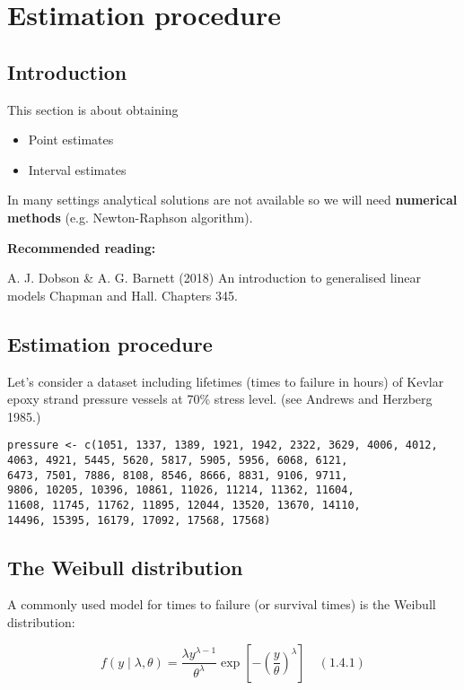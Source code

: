 \documentclass[11pt]{article}
\begin{document}
\section{Estimation procedure}

\subsection{Introduction}

This section is about obtaining
\begin{itemize}
    \item Point estimates
    \item Interval estimates
\end{itemize}

In many settings analytical solutions are not available so we will need \textbf{numerical methods} (e.g. Newton-Raphson algorithm).

\textbf{Recommended reading:}

A. J. Dobson \& A. G. Barnett (2018) An introduction to generalised linear models Chapman and Hall. Chapters 345.

\subsection{Estimation procedure}

Let's consider a dataset including lifetimes (times to failure in hours) of Kevlar epoxy strand pressure vessels at 70\% stress level. (see Andrews and Herzberg 1985.)

\begin{verbatim}
pressure <- c(1051, 1337, 1389, 1921, 1942, 2322, 3629, 4006, 4012,
4063, 4921, 5445, 5620, 5817, 5905, 5956, 6068, 6121,
6473, 7501, 7886, 8108, 8546, 8666, 8831, 9106, 9711,
9806, 10205, 10396, 10861, 11026, 11214, 11362, 11604,
11608, 11745, 11762, 11895, 12044, 13520, 13670, 14110,
14496, 15395, 16179, 17092, 17568, 17568)
\end{verbatim}

\subsection{The Weibull distribution}

A commonly used model for times to failure (or survival times) is the Weibull distribution:

\begin{equation}
    f(y \mid \lambda, \theta) = \frac{\lambda y^{\lambda - 1}}{\theta^\lambda} \exp\left[- \left(\frac{y}{\theta}\right)^\lambda\right] \quad (1.4.1)
\end{equation}
\end{document}

